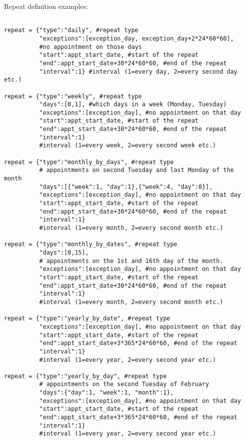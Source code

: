 Repeat definition examples:

\begin{verbatim}

repeat = {"type":"daily", #repeat type
          "exceptions":[exception_day, exception_day+2*24*60*60],  
          #no appointment on those days
          "start":appt_start_date, #start of the repeat
          "end":appt_start_date+30*24*60*60, #end of the repeat
          "interval":1} #interval (1=every day, 2=every second day etc.)

repeat = {"type":"weekly", #repeat type
          "days":[0,1], #which days in a week (Monday, Tuesday)
          "exceptions":[exception_day], #no appointment on that day
          "start":appt_start_date, #start of the repeat
          "end":appt_start_date+30*24*60*60, #end of the repeat
          "interval":1}  
          #interval (1=every week, 2=every second week etc.) 

repeat = {"type":"monthly_by_days", #repeat type
          # appointments on second Tuesday and last Monday of the month
          "days":[{"week":1, "day":1},{"week":4, "day":0}],
          "exceptions":[exception_day], #no appointment on that day 
          "start":appt_start_date, #start of the repeat
          "end":appt_start_date+30*24*60*60, #end of the repeat
          "interval":1}  
          #interval (1=every month, 2=every second month etc.)

repeat = {"type":"monthly_by_dates", #repeat type
          "days":[0,15],  
          # appointments on the 1st and 16th day of the month.
          "exceptions":[exception_day], #no appointment on that day
          "start":appt_start_date, #start of the repeat
          "end":appt_start_date+30*24*60*60, #end of the repeat
          "interval":1}  
          #interval (1=every month, 2=every second month etc.)

repeat = {"type":"yearly_by_date", #repeat type
          "exceptions":[exception_day], #no appointment on that day 
          "start":appt_start_date, #start of the repeat
          "end":appt_start_date+3*365*24*60*60, #end of the repeat
          "interval":1}  
          #interval (1=every year, 2=every second year etc.)

repeat = {"type":"yearly_by_day", #repeat type
          # appointments on the second Tuesday of February
          "days":{"day":1, "week":1, "month":1},
          "exceptions":[exception_day], #no appointment on that day 
          "start":appt_start_date, #start of the repeat
          "end":appt_start_date+3*365*24*60*60, #end of the repeat
          "interval":1}  
          #interval (1=every year, 2=every second year etc.)

\end{verbatim}
